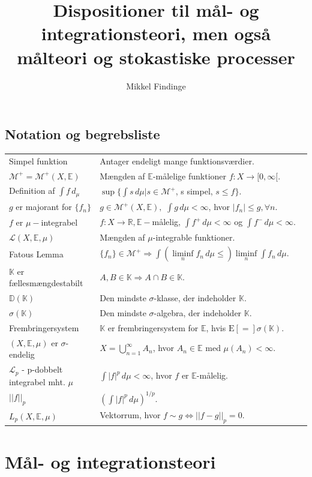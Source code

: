 \documentclass[12pt]{report}
\title{Dispositioner til mål- og integrationsteori, men også målteori og stokastiske processer}
\author{Mikkel Findinge}
\theoremstyle{break}
\theoremstyle{break}
\newcommand{\E}[1]{\mathrm{E}\left[#1\right]}
\newcommand{\Int}[1]{\int#1\,d\mu}
\newcommand{\RR}{\mathbb{R}}
\newcommand{\EE}{\mathbb{E}}
\newcommand{\M}{\mathcal{M}^+}
\renewcommand{\L}{\mathcal{L}}
\newcommand{\K}{\mathbb{K}}
\newcommand{\D}{\mathbb{D}}
\newcommand{\laengde}[1]{\lvert|#1\rvert|}
\begin{document}
\maketitle
{}

\section*{Notation og begrebsliste}
\renewcommand{\arraystretch}{3}
\begin{tabular}{p{0.3\linewidth}p{0.7\linewidth}}
Simpel funktion & Antager endeligt mange funktionsværdier.
\\
$\M=\M(X,\EE)$ & Mængden af $\EE$-målelige funktioner $f\colon X\to[0,\infty[$.
\\
Definition af $\int f\, d_\mu$ & $\sup\{\int s\, d\mu| s\in\M$, s simpel, $s\leq f\}$.
\\
$g$ er majorant for $\{f_n\}$ & $g\in\M(X,\EE),$ $\int g\, d\mu<\infty$, hvor $\lvert f_n\rvert\leq g, \forall n$.
\\
$f$ er $\mu-$integrabel & $f\colon X\to\RR, \EE-$målelig, $\int f^+\, d\mu<\infty$ og $\int f^-\, d\mu<\infty$.
\\
$\L(X,\EE,\mu)$ & Mængden af $\mu$-integrable funktioner.
\\
Fatous Lemma & $\{f_n\}\in\M\Rightarrow\int\left(\liminf\limits_nf_n\, d\mu\leq\right)\liminf\limits_n\int f_n\, d\mu.$
\\
$\K$ er fællesmængdestabilt & $A,B\in\K\Rightarrow A\cap B\in\K$.
\\
$\D(\K)$ & Den mindste $\sigma$-klasse, der indeholder $\K$.
\\
$\sigma(\K)$ & Den mindste $\sigma$-algebra, der indeholder $\K$.
\\
Frembringersystem & $\K$ er frembringersystem for $\EE$, hvis $\E = \sigma(\K)$.
\\
$(X,\EE,\mu)$ er $\sigma$-endelig & $X = \bigcup_{n = 1}^\infty  {A_n}$, hvor $A_n\in\EE$ med $\mu(A_n)<\infty$.
\\
$\L_p$ - p-dobbelt integrabel mht. $\mu$ & $\Int{|f|^p}<\infty$, hvor $f$ er $\EE$-målelig.
\\
$\laengde{f}_p$ & $\left(\Int{|f|^p}\right)^{1/p}$.
\\
$L_p(X,\EE,\mu)$ & Vektorrum, hvor $f\sim g\Leftrightarrow\laengde{f-g}_p=0$.
\end{tabular}


\newpage
\chapter*{Mål- og integrationsteori}
\end{document}
